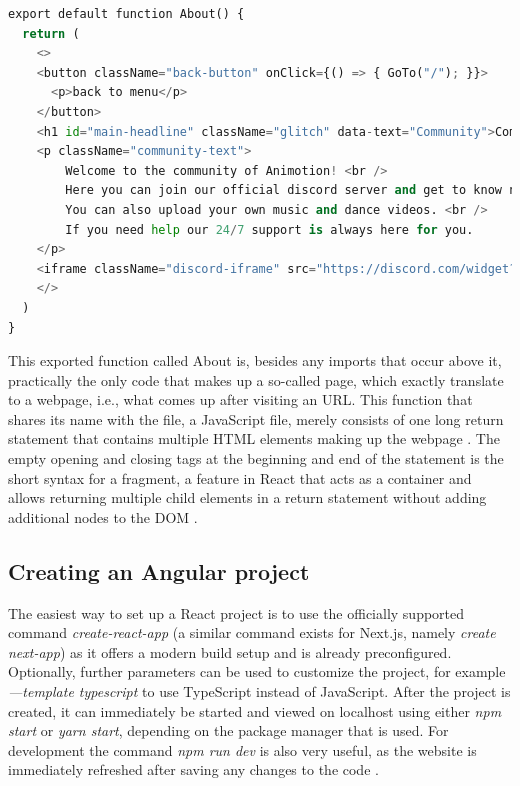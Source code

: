 \begin{lstlisting}[language=Python,caption=Example of a react component,label=lst:react]
  export default function About() {
  return (
    <>
    <button className="back-button" onClick={() => { GoTo("/"); }}>
      <p>back to menu</p>
    </button>
    <h1 id="main-headline" className="glitch" data-text="Community">Community</h1>
    <p className="community-text">
        Welcome to the community of Animotion! <br />
        Here you can join our official discord server and get to know new people. <br />
        You can also upload your own music and dance videos. <br />
        If you need help our 24/7 support is always here for you.
    </p>
    <iframe className="discord-iframe" src="https://discord.com/widget?id=1035647726634934382&theme=dark" allowtransparency="true" frameBorder="0" sandbox="allow-popups allow-popups-to-escape-sandbox allow-same-origin allow-scripts"></iframe>
    </>
  )
}
\end{lstlisting}

This exported function called About is, besides any imports that occur above it, practically the only code that makes 
up a so-called page, which exactly translate to a webpage, i.e., what comes up after visiting an URL. This function 
that shares its name with the file, a JavaScript file, merely consists of one long return statement that 
contains multiple HTML elements making up the webpage \cite{ReactJSX}.
The empty opening and closing tags at the beginning and end of the statement is the short syntax for a fragment, a 
feature in React that acts as a container and allows returning multiple child elements in a return statement 
without adding additional nodes to the DOM \cite{ReactFragments}.
\\
\subsection{Creating an Angular project}
The easiest way to set up a React project is to use the officially supported command \emph{create-react-app}
(a similar command exists for Next.js, namely \emph{create next-app}) as it offers a modern build setup and is already preconfigured. 
Optionally, further parameters can be used to customize the project, for example \emph{—template typescript} to use TypeScript 
instead of JavaScript. After the project is created, it can immediately be started and viewed on localhost using either 
\emph{npm start} or \emph{yarn start}, depending on the package manager that is used. For development the command \emph{npm run dev} is 
also very useful, as the website is immediately refreshed after saving any changes to the code \cite{create-react}.
\\
